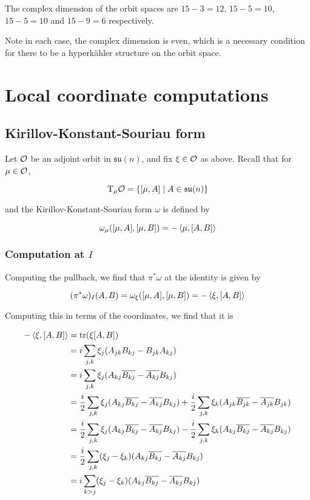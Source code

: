 \documentclass{article}
\newcommand{\su}{\mathfrak{su}}
\begin{document}
The complex dimension of the orbit spaces are \(15 - 3 = 12\), \(15 - 5 = 10\), \(15 - 5 = 10\) and \(15 - 9 = 6\) respectively.

Note in each case, the complex dimension is even, which is a necessary condition for there to be a hyperk\"ahler structure on the orbit space.

\section{Local coordinate computations}

\subsection{Kirillov-Konstant-Souriau form}

Let \(\mathcal{O}\) be an adjoint orbit in \(\su(n)\), and fix \(\xi \in \mathcal{O}\) as above. Recall that for \(\mu \in \mathcal{O}\),

\[\TT_\mu\mcO = \left\{[\mu, A] \mid A \in \su(n)\right\}\]

and the Kirillov-Konstant-Souriau form \(\omega\) is defined by

\[\omega_\mu([\mu, A], [\mu, B]) = -\left\langle \mu, [A, B] \right\rangle\]

\subsubsection{Computation at \(I\)}

Computing the pullback, we find that \(\pi^*\omega\) at the identity is given by

\[(\pi^*\omega)_I(A, B) = \omega_\xi([\mu, A], [\mu, B]) = -\left\langle \xi, [A, B] \right\rangle\]

Computing this in terms of the coordinates, we find that it is

\begin{align*}
    -\left\langle \xi, [A, B] \right\rangle &= \tr(\xi[A, B]) \\
    &= i\sum_{j, k}\xi_j(A_{jk}B_{kj} - B_{jk}A_{kj}) \\
    &= i\sum_{j, k}\xi_j(A_{kj}\overline{B_{kj}} - \overline{A_{kj}}B_{kj}) \\
    &= \frac{i}{2} \sum_{j,k}\xi_j(A_{kj}\overline{B_{kj}} - \overline{A_{kj}}B_{kj}) + \frac{i}{2}\sum_{j, k}\xi_k(A_{jk} \overline{B_{jk}} - \overline{A_{jk}}B_{jk}) \\
    &= \frac{i}{2} \sum_{j,k}\xi_j(A_{kj}\overline{B_{kj}} - \overline{A_{kj}}B_{kj}) - \frac{i}{2}\sum_{j, k}\xi_k(A_{kj} \overline{B_{kj}} - \overline{A_{kj}}B_{kj}) \\
    &= \frac{i}{2}\sum_{j, k}(\xi_j - \xi_k)(A_{kj}\overline{B_{kj}} - \overline{A_{kj}}B_{kj}) \\
    &= i \sum_{k > j}(\xi_j - \xi_k)(A_{kj}\overline{B_{kj}} - \overline{A_{kj}}B_{kj})
\end{align*}
\end{document}
